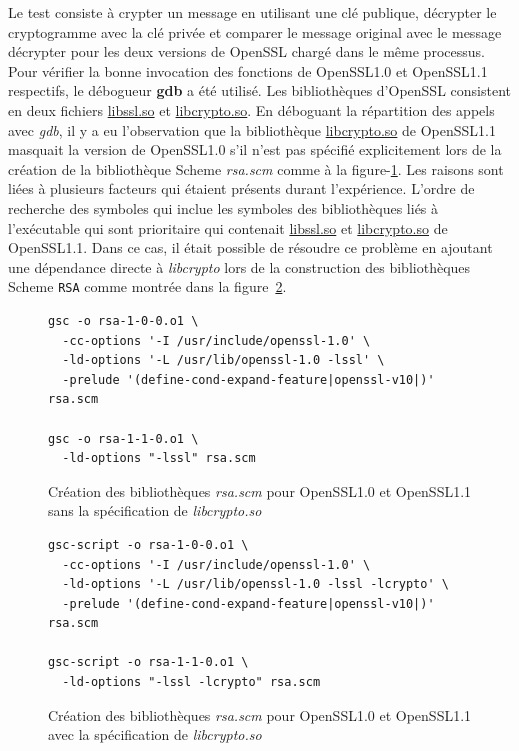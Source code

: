 Le test consiste à crypter un message en utilisant une clé publique, décrypter
le cryptogramme avec la clé privée et comparer le message original avec le
message décrypter pour les deux versions de OpenSSL chargé dans le même
processus. Pour vérifier la bonne invocation des fonctions de OpenSSL1.0 et
OpenSSL1.1 respectifs, le débogueur \textbf{gdb} a été utilisé. Les
bibliothèques d'OpenSSL consistent en deux fichiers \url{libssl.so} et
\url{libcrypto.so}.  En déboguant la répartition des appels avec \textit{gdb},
il y a eu l'observation que la bibliothèque \url{libcrypto.so} de OpenSSL1.1
masquait la version de OpenSSL1.0 s'il n'est pas spécifié explicitement lors de
la création de la bibliothèque Scheme \textit{rsa.scm} comme à la
figure-\ref{fig:scm_masq1}. Les raisons sont liées à plusieurs facteurs qui
étaient présents durant l'expérience. L'ordre de recherche des symboles qui
inclue les symboles des bibliothèques liés à l'exécutable qui sont prioritaire
qui contenait \url{libssl.so} et \url{libcrypto.so} de OpenSSL1.1.  Dans ce
cas, il était possible de résoudre ce problème en ajoutant une dépendance
directe à \textit{libcrypto} lors de la construction des bibliothèques Scheme
\verb+RSA+ comme montrée dans la figure~\ref{fig:scm_masq_fix1}.

\begin{center}
\begin{figure}[ht]
\begin{lstlisting}[frame=single]
gsc -o rsa-1-0-0.o1 \
  -cc-options '-I /usr/include/openssl-1.0' \
  -ld-options '-L /usr/lib/openssl-1.0 -lssl' \
  -prelude '(define-cond-expand-feature|openssl-v10|)' rsa.scm

gsc -o rsa-1-1-0.o1 \
  -ld-options "-lssl" rsa.scm
\end{lstlisting}
\caption{Création des bibliothèques \textit{rsa.scm} pour OpenSSL1.0 et OpenSSL1.1
sans la spécification de \textit{libcrypto.so}}
\label{fig:scm_masq1}
\end{figure}
\end{center}

\begin{center}
\begin{figure}[ht]
\begin{lstlisting}[frame=single]
gsc-script -o rsa-1-0-0.o1 \
  -cc-options '-I /usr/include/openssl-1.0' \
  -ld-options '-L /usr/lib/openssl-1.0 -lssl -lcrypto' \
  -prelude '(define-cond-expand-feature|openssl-v10|)' rsa.scm

gsc-script -o rsa-1-1-0.o1 \
  -ld-options "-lssl -lcrypto" rsa.scm
\end{lstlisting}
\caption{Création des bibliothèques \textit{rsa.scm} pour OpenSSL1.0 et OpenSSL1.1
avec la spécification de \textit{libcrypto.so}}
\label{fig:scm_masq_fix1}
\end{figure}
\end{center}

